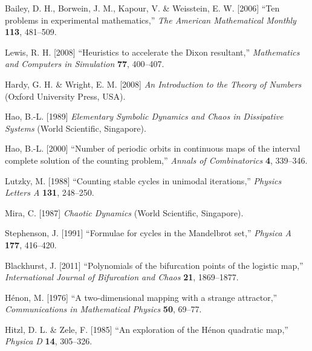 \documentclass{ws-ijbc}
\begin{document}
\begin{thebibliography}{50}
  Bailey, D. H., Borwein, J. M., Kapour, V. \& Weisstein, E. W. [2006]
  ``Ten problems in experimental mathematics,''
  {\it The American Mathematical Monthly}
  \textbf{113},
  481--509.

  Lewis, R. H. [2008]
  ``Heuristics to accelerate the Dixon resultant,''
  {\it Mathematics and Computers in Simulation}
  \textbf{77},
  400--407.

  Hardy, G. H. \& Wright, E. M. [2008]
  {\it An Introduction to the Theory of Numbers}
  (Oxford University Press, USA).

  Hao, B.-L. [1989]
  {\it Elementary Symbolic Dynamics and Chaos in  Dissipative Systems}
  (World Scientific, Singapore).

  Hao, B.-L. [2000]
  ``Number of periodic orbits in continuous maps of
  the interval complete solution of the counting problem,''
  {\it Annals of Combinatorics}
  \textbf{4},
  339--346.

  Lutzky, M. [1988]
  ``Counting stable cycles in unimodal iterations,''
  {\it Physics Letters A}
  \textbf{131},
  248--250.

  Mira, C. [1987]
  {\it Chaotic Dynamics}
  (World Scientific, Singapore).

  Stephenson, J. [1991]
  ``Formulae for cycles in the Mandelbrot set,''
  {\it Physica A}
  \textbf{177},
  416--420.

  Blackhurst, J. [2011]
  ``Polynomials of the bifurcation points of the logistic map,''
  {\it International Journal of Bifurcation and Chaos}
  \textbf{21},
  1869--1877.

  H\'enon, M. [1976]
  ``A two-dimensional mapping with a strange attractor,''
  {\it Communications in Mathematical Physics}
  \textbf{50},
  69--77.

  Hitzl, D. L. \& Zele, F. [1985]
  ``An exploration of the H\'enon quadratic map,''
  {\it Physica D}
  \textbf{14},
  305--326.

\end{thebibliography}
\end{document}
